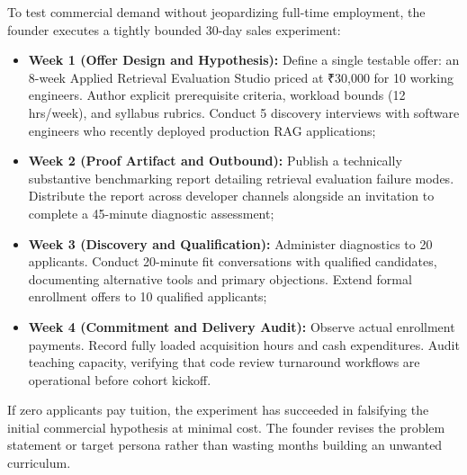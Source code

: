 To test commercial demand without jeopardizing full-time employment, the founder executes a tightly bounded 30-day sales experiment:
\begin{itemize}
\item \textbf{Week 1 (Offer Design and Hypothesis):} Define a single testable offer: an 8-week Applied Retrieval Evaluation Studio priced at ₹30,000 for 10 working engineers. Author explicit prerequisite criteria, workload bounds (12 hrs/week), and syllabus rubrics. Conduct 5 discovery interviews with software engineers who recently deployed production RAG applications;
\item \textbf{Week 2 (Proof Artifact and Outbound):} Publish a technically substantive benchmarking report detailing retrieval evaluation failure modes. Distribute the report across developer channels alongside an invitation to complete a 45-minute diagnostic assessment;
\item \textbf{Week 3 (Discovery and Qualification):} Administer diagnostics to 20 applicants. Conduct 20-minute fit conversations with qualified candidates, documenting alternative tools and primary objections. Extend formal enrollment offers to 10 qualified applicants;
\item \textbf{Week 4 (Commitment and Delivery Audit):} Observe actual enrollment payments. Record fully loaded acquisition hours and cash expenditures. Audit teaching capacity, verifying that code review turnaround workflows are operational before cohort kickoff.
\end{itemize}
If zero applicants pay tuition, the experiment has succeeded in falsifying the initial commercial hypothesis at minimal cost. The founder revises the problem statement or target persona rather than wasting months building an unwanted curriculum.
